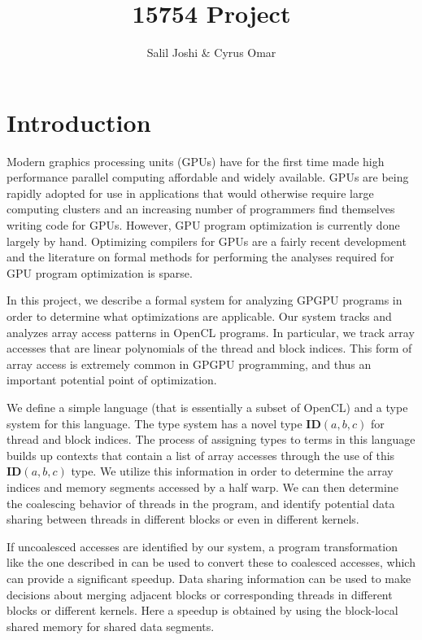 \documentclass{article}
\title{15754 Project}
\author{Salil Joshi \& Cyrus Omar}
\newcommand{\id}[3]{\textbf{ID}(#1, #2, #3)}
\renewcommand{\|}{\:|\:}
\begin{document}
\maketitle
\section{Introduction}
Modern graphics processing units (GPUs) have for the first time made high performance parallel computing affordable and widely available. GPUs are being rapidly adopted for use in applications that would otherwise require large computing clusters and an increasing number of programmers find themselves writing code for GPUs. However, GPU program optimization is currently done largely by hand. Optimizing compilers for GPUs are a fairly recent development and the literature on formal methods for performing the analyses required for GPU program optimization is sparse.


In this project, we describe a formal system for analyzing GPGPU programs in order to determine what optimizations are applicable. Our system tracks and analyzes array access patterns in OpenCL programs. In particular, we track array accesses that are linear polynomials of the thread and block indices. This form of array access is extremely common in GPGPU programming, and thus an important potential point of optimization.


We define a simple language (that is essentially a subset of OpenCL) and a type system for this language. The type system has a novel type $\id{a}{b}{c}$ for thread and block indices. The process of assigning types to terms in this language builds up contexts that contain a list of array accesses through the use of this $\id{a}{b}{c}$ type. We utilize this information in order to determine the array indices and memory segments accessed by a half warp. We can then determine the coalescing behavior of threads in the program, and identify potential data sharing between threads in different blocks or even in different kernels. 


If uncoalesced accesses are identified by our system, a program transformation like the one described in \cite{pldi10} can be used to convert these to coalesced accesses, which can provide a significant speedup. Data sharing information can be used to make decisions about merging adjacent blocks or corresponding threads in different blocks or different kernels. Here a speedup is obtained by using the block-local shared memory for shared data segments.
\end{document}
